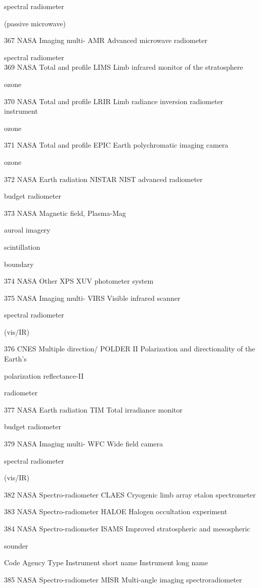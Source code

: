 spectral radiometer

(passive microwave)

367 NASA Imaging multi- AMR Advanced microwave radiometer

spectral radiometer\\
369 NASA Total and profile LIMS Limb infrared monitor of the stratosphere

ozone

370 NASA Total and profile LRIR Limb radiance inversion radiometer instrument

ozone

371 NASA Total and profile EPIC Earth polychromatic imaging camera

ozone

372 NASA Earth radiation NISTAR NIST advanced radiometer

budget radiometer

373 NASA Magnetic field, Plasma-Mag

auroal imagery

scintillation

boundary

374 NASA Other XPS XUV photometer system

375 NASA Imaging multi- VIRS Visible infrared scanner

spectral radiometer

(vis/IR)

376 CNES Multiple direction/ POLDER II Polarization and directionality of the Earth's

polarization reflectance-II

radiometer

377 NASA Earth radiation TIM Total irradiance monitor

budget radiometer

379 NASA Imaging multi- WFC Wide field camera

spectral radiometer

(vis/IR)

382 NASA Spectro-radiometer CLAES Cryogenic limb array etalon spectrometer

383 NASA Spectro-radiometer HALOE Halogen occultation experiment

384 NASA Spectro-radiometer ISAMS Improved stratospheric and mesospheric

sounder

Code Agency Type Instrument short name Instrument long name

385 NASA Spectro-radiometer MISR Multi-angle imaging spectroradiometer

